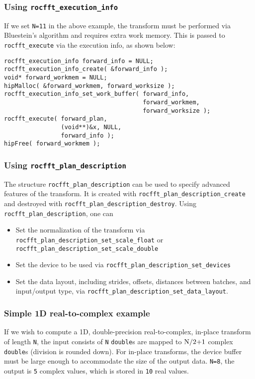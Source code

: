 \documentclass[10pt]{article}
\renewcommand{\(}{\left(}
\renewcommand{\)}{\right)}
\begin{document}
\subsubsection{Using \lstinline{rocfft_execution_info}}
If we set \lstinline{N=11} in the above example, the transform
must be performed via Bluestein's algorithm and requires extra work
memory.  This is passed to \lstinline{rocfft_execute} via the
execution info, as shown below:
\begin{lstlisting}
rocfft_execution_info forward_info = NULL;
rocfft_execution_info_create( &forward_info );
void* forward_workmem = NULL;
hipMalloc( &forward_workmem, forward_worksize );
rocfft_execution_info_set_work_buffer( forward_info,
                                       forward_workmem,
                                       forward_worksize );
rocfft_execute( forward_plan,
                (void**)&x, NULL,
                forward_info );
hipFree( forward_workmem );
\end{lstlisting}

\subsubsection{Using \lstinline{rocfft_plan_description}}

The structure \lstinline{rocfft_plan_description} can be used to
specify advanced features of the transform.  It is created with
\lstinline{rocfft_plan_description_create} and destroyed with
\lstinline{rocfft_plan_description_destroy}.  Using
\lstinline{rocfft_plan_description}, one can
\begin{itemize}
\item Set the normalization of the transform via
  \lstinline{rocfft_plan_description_set_scale_float} or
  \lstinline{rocfft_plan_description_set_scale_double}
\item Set the device to be used via
  \lstinline{rocfft_plan_description_set_devices}
\item Set the data layout, including strides, offsets, distances
  between batches, and input/output type, via
  \lstinline{rocfft_plan_description_set_data_layout}.
\end{itemize}

\subsubsection{Simple 1D real-to-complex example}
If we wish to compute a 1D, double-precision real-to-complex, in-place
transform of length \lstinline{N}, the input consists of
\lstinline{N} \lstinline{double}s are mapped to
$\text{\lstinline{N/2+1}}$ complex \lstinline{double}s (division
is rounded down).  For in-place transforms, the device buffer must be
large enough to accommodate the size of the output
data. \lstinline{N=8}, the output is \lstinline{5} complex
values, which is stored in \lstinline{10} real values.
\end{document}
